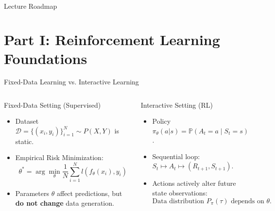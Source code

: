 \documentclass[10pt, aspectratio=169]{beamer}
\begin{document}
\begin{frame}{Lecture Roadmap}
  \tableofcontents
\end{frame}

\section{Part I: Reinforcement Learning Foundations}

\begin{frame}{Fixed-Data Learning vs. Interactive Learning}
  \begin{columns}
    \begin{block}{Fixed-Data Setting (Supervised)}
      \begin{itemize}
        \item Dataset $\mathcal{D} = \{(x_i, y_i)\}_{i=1}^N \sim P(X, Y)$ is static.
        \item Empirical Risk Minimization:
          $$\theta^* = \arg\min_\theta \frac{1}{N} \sum_{i=1}^N l(f_\theta(x_i), y_i)$$
        \item Parameters $\theta$ affect predictions, but \textbf{do not change} data generation.
      \end{itemize}
    \end{block}

    \begin{block}{Interactive Setting (RL)}
      \begin{itemize}
        \item Policy $\pi_\theta(a|s) = \mathbb{P}(A_t = a \mid S_t = s)$.
        \item Sequential loop: $S_t \mapsto A_t \mapsto (R_{t+1}, S_{t+1})$.
        \item Actions actively alter future state observations:
          $$\text{Data distribution } P_\pi(\tau) \text{ depends on } \theta.$$
      \end{itemize}
    \end{block}
  \end{columns}
\end{frame}
\end{document}
